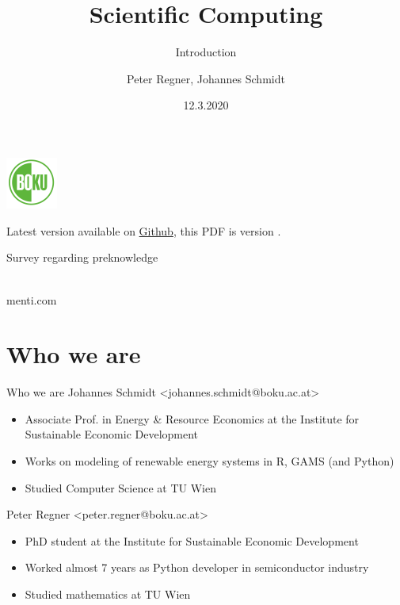 \documentclass[10pt,color=usenames,dvipsnames]{beamer}
\title[Scientific Computing]{Scientific Computing}
\subtitle{Introduction}
\author{Peter Regner, Johannes Schmidt}
\institute{Institute for Sustainable Economic Development, BOKU, Wien}
\date{12.3.2020}
\newcommand{\gitrevision}{%
  \StrLeft{\HEAD}{7}%
}
\begin{document}
\begin{frame}[plain]
    \maketitle
    \begin{center}
        \includegraphics[height=1.7cm]{boku-logo.pdf}\\
    \end{center}
    \vfill
    {
        \tiny
        Latest version available on
        \href{https://github.com/inwe-boku/lecture-scientific-computing/}{Github},
        this PDF is version \gitrevision.
    }
\end{frame}

\begin{frame}{Survey regarding preknowledge}
    \begin{center}
        \textcolor{black}{
        }\\
        \vspace{0.5cm}
        \huge{
            menti.com
        }
    \end{center}
\end{frame}

\begin{frame}

	\tableofcontents

\end{frame}

\section{Who we are}

\begin{frame}{Who we are}
    Johannes Schmidt <johannes.schmidt@boku.ac.at>\\
    \begin{itemize}
        \item Associate Prof. in Energy \& Resource Economics at the Institute for Sustainable Economic Development
        \item Works on modeling of renewable energy systems in R, GAMS (and Python)
        \item Studied Computer Science at TU Wien
    \end{itemize}

    \pause
    \bigskip

    Peter Regner <peter.regner@boku.ac.at>
    \begin{itemize}
        \item PhD student at the Institute for Sustainable Economic Development
        \item Worked almost 7 years as Python developer in semiconductor industry
        \item Studied mathematics at TU Wien
    \end{itemize}
\end{frame}
\end{document}
